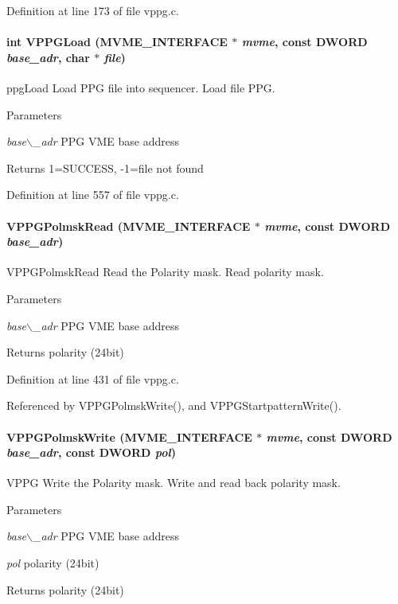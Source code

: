 Definition at line 173 of file vppg.c.
\paragraph[{VPPGLoad}]{\setlength{\rightskip}{0pt plus 5cm}int VPPGLoad ({\bf MVME\_\-INTERFACE} $\ast$ {\em mvme}, \/  const {\bf DWORD} {\em base\_\-adr}, \/  char $\ast$ {\em file})}\hfill\label{vppg_8c_acd643aa3649bb10efabfdc28963ac52b}
ppgLoad Load PPG file into sequencer.  Load file PPG. 
\begin{DoxyParams}{Parameters}
\item[{\em base$\backslash$\_\-adr}]PPG VME base address \end{DoxyParams}
\begin{DoxyReturn}{Returns}
1=SUCCESS, -\/1=file not found 
\end{DoxyReturn}


Definition at line 557 of file vppg.c.
\paragraph[{VPPGPolmskRead}]{ VPPGPolmskRead ({\bf MVME\_\-INTERFACE} $\ast$ {\em mvme}, \/  const {\bf DWORD} {\em base\_\-adr})}\hfill\label{vppg_8c_afc374ec00602443b45c71d28043d7631}
VPPGPolmskRead Read the Polarity mask.  Read polarity mask. 
\begin{DoxyParams}{Parameters}
\item[{\em base$\backslash$\_\-adr}]PPG VME base address \end{DoxyParams}
\begin{DoxyReturn}{Returns}
polarity (24bit) 
\end{DoxyReturn}


Definition at line 431 of file vppg.c.

Referenced by VPPGPolmskWrite(), and VPPGStartpatternWrite().
\paragraph[{VPPGPolmskWrite}]{ VPPGPolmskWrite ({\bf MVME\_\-INTERFACE} $\ast$ {\em mvme}, \/  const {\bf DWORD} {\em base\_\-adr}, \/  const {\bf DWORD} {\em pol})}\hfill\label{vppg_8c_a10ec4e8a15c99cffbb75a1bba6d72c1d}
VPPG Write the Polarity mask.  Write and read back polarity mask. 
\begin{DoxyParams}{Parameters}
\item[{\em base$\backslash$\_\-adr}]PPG VME base address \item[{\em pol}]polarity (24bit) \end{DoxyParams}
\begin{DoxyReturn}{Returns}
polarity (24bit) 
\end{DoxyReturn}


